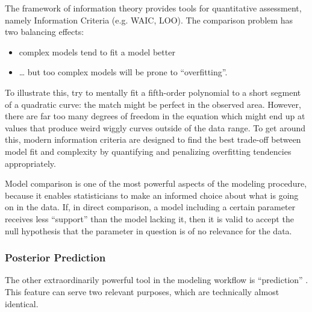 The framework of information theory provides tools for quantitative assessment, namely Information Criteria (e.g. WAIC, LOO).
The comparison problem has two balancing effects:
\begin{itemize}
\item complex models tend to fit a model better
\item \ldots{} but too complex models will be prone to ``overfitting''.
\end{itemize}

To illustrate this, try to mentally fit a fifth-order polynomial to a short segment of a quadratic curve: the match might be perfect in the observed area.
However, there are far too many degrees of freedom in the equation which might end up at values that produce weird wiggly curves outside of the data range.
To get around this, modern information criteria are designed to find the best trade-off between model fit and complexity by quantifying and penalizing overfitting tendencies appropriately.

Model comparison is one of the most powerful aspects of the modeling procedure, because it enables statisticians to make an informed choice about what is going on in the data.
If, in direct comparison, a model including a certain parameter receives less ``support'' than the model lacking it, then it is valid to accept the null hypothesis that the parameter in question is of no relevance for the data.


\subsubsection{Posterior Prediction}
\label{workflow:prediction}
The other extraordinarily powerful tool in the modeling workflow is ``prediction'' \citep{Shmueli2010}.
This feature can serve two relevant purposes, which are technically almost identical.


